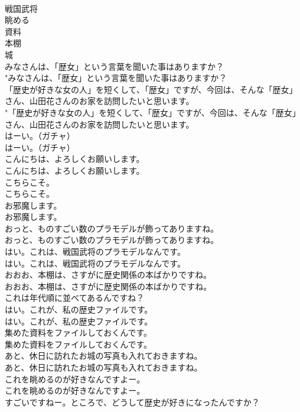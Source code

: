 \documentclass[8pt]{extreport}
\begin{document}
\begin{CJK}{UTF8}{min}
\\	戦国武将
\\	眺める
\\	資料
\\	本棚
\\	城
\\	みなさんは、「歴女」という言葉を聞いた事はありますか？	
\\	"みなさんは、「歴女」という言葉を聞いた事はありますか？ 
\\	「歴史が好きな女の人」を短くして、「歴女」ですが、今回は、そんな「歴女」さん、山田花さんのお家を訪問したいと思います。	
\\	"「歴史が好きな女の人」を短くして、「歴女」ですが、今回は、そんな「歴女」さん、山田花さんのお家を訪問したいと思います。 
\\	はーい。（ガチャ）	
\\	はーい。（ガチャ） 
\\	こんにちは、よろしくお願いします。	
\\	こんにちは、よろしくお願いします。 
\\	こちらこそ。	
\\	こちらこそ。 
\\	お邪魔します。	
\\	お邪魔します。 
\\	おっと、ものすごい数のプラモデルが飾ってありますね。	
\\	おっと、ものすごい数のプラモデルが飾ってありますね。 
\\	はい。これは、戦国武将のプラモデルなんです。	
\\	はい。これは、戦国武将のプラモデルなんです。 
\\	おおお、本棚は、さすがに歴史関係の本ばかりですね。	
\\	おおお、本棚は、さすがに歴史関係の本ばかりですね。 
\\	これは年代順に並べてあるんですね？	
\\	はい。これが、私の歴史ファイルです。	
\\	はい。これが、私の歴史ファイルです。 
\\	集めた資料をファイルしておくんです。	
\\	集めた資料をファイルしておくんです。 
\\	あと、休日に訪れたお城の写真も入れておきますね。	
\\	あと、休日に訪れたお城の写真も入れておきますね。 
\\	これを眺めるのが好きなんですよー。	
\\	これを眺めるのが好きなんですよー。 
\\	すごいですねー。ところで、どうして歴史が好きになったんですか？	

\end{CJK}
\end{document}
